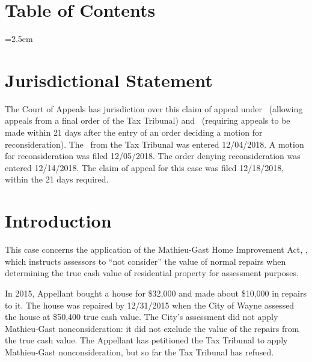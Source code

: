 \documentclass[12pt,\documentclassflag]{michiganCourtOfAppealsBrief}
\begin{document}
\pagestyle{romanparen}
\newpage 

\section*{Table of Contents}

\tableofcontents

\newpage
\tableofauthorities

\pagestyle{plain}



\parindent=2.5em
\doublespacing

\section{Jurisdictional Statement}
 
The Court of Appeals has jurisdiction over this claim of appeal under \cite{MCL 205.753(2)}\ (allowing appeals from a final order of the Tax Tribunal) and \cite{MCR 7.204(A)(1)(b)}\ (requiring appeals to be made within 21 days after the entry of an order deciding a motion for reconsideration). The \fojAbbr\ from the Tax Tribunal was entered 12/04/2018. A motion for reconsideration was filed 12/05/2018. The order denying reconsideration was entered 12/14/2018. The claim of appeal for this case was filed 12/18/2018, within the 21 days required.

\newpage 
\section{Introduction}

This case concerns the application of the Mathieu-Gast Home Improvement Act, \cite[s]{MCL 211.27(2)}, which instructs assessors to ``not consider'' the value of normal repairs when determining the true cash value of residential property for assessment purposes.

In 2015, Appellant bought a house for \$32,000 and made about \$10,000 in repairs to it. The house was repaired by 12/31/2015 when the City of Wayne assessed the house at \$50,400 true cash value. The City's assessment did not apply Mathieu-Gast nonconsideration: it did not exclude the value of the repairs from the true cash value. The Appellant has petitioned the Tax Tribunal to apply Mathieu-Gast nonconsideration, but so far the Tax Tribunal has refused.
\end{document}
